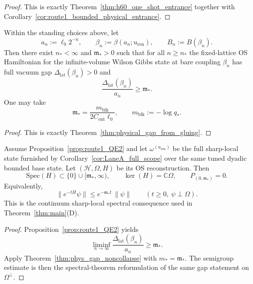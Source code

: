 \begin{proof}
This is exactly Theorem~\ref{thm:h60_one_shot_entrance} together with Corollary~\ref{cor:route1_bounded_physical_entrance}.
\end{proof}

\begin{proposition}\label{prop:route1_QE2}\label{cor:route1_QE2_full_lattice_gap}
Within the standing choices above, let
\[
a_n:=\ell_0 2^{-n},\qquad \beta_n:=\beta(a_n;u_{\mathrm{ren}}),\qquad B_n:=B(\beta_n).
\]
Then there exist $n_\ast<\infty$ and $\mathfrak m_\ast>0$ such that for all $n\ge n_\ast$ the fixed-lattice OS Hamiltonian for the infinite-volume Wilson Gibbs state at bare coupling $\beta_n$ has full vacuum gap $\Delta_{\mathrm{lat}}(\beta_n)>0$ and
\begin{equation}
 \frac{\Delta_{\mathrm{lat}}(\beta_n)}{a_n}\ge \mathfrak m_\ast.
 \label{eq:route1_QE2_lat_main}
\end{equation}
One may take
\begin{equation}
 \mathfrak m_\ast=\frac{m_{\mathrm{blk}}}{2C_{\mathrm{ent}}\ell_0},
 \qquad m_{\mathrm{blk}}:=-\log q_\ast.
 \label{eq:mstar_explicit}
\end{equation}
\end{proposition}

\begin{proof}
This is exactly Theorem~\ref{thm:physical_gap_from_gluing}.
\end{proof}

\begin{corollary}\label{cor:route1_QE3_gap}
Assume Proposition~\ref{prop:route1_QE2} and let $\omega^{(u_{\mathrm{ren}})}$ be the full sharp-local state furnished by Corollary~\ref{cor:LaneA_full_scope} over the same tuned dyadic bounded base state.
Let $(\mathcal H,\Omega,H)$ be its OS reconstruction.
Then
\[
\mathrm{Spec}(H)\subset\{0\}\cup[\mathfrak m_\ast,\infty),
\qquad
\ker(H)=\mathbb C\Omega,
\qquad
P_{(0,\mathfrak m_\ast)}=0.
\]
Equivalently,
\[
\|e^{-tH}\psi\|\le e^{-\mathfrak m_\ast t}\,\|\psi\|
\qquad (t\ge 0,\ \psi\perp\Omega).
\]
This is the continuum sharp-local spectral consequence used in Theorem~\ref{thm:main}(D).
\end{corollary}

\begin{proof}
Proposition~\ref{prop:route1_QE2} yields
\[
\liminf_{n\to\infty}\frac{\Delta_{\mathrm{lat}}(\beta_n)}{a_n}\ge \mathfrak m_\ast.
\]
Apply Theorem~\ref{thm:phys_gap_noncollapse} with $m_*=\mathfrak m_\ast$.
The semigroup estimate is then the spectral-theorem reformulation of the same gap statement on $\Omega^\perp$.
\end{proof}

